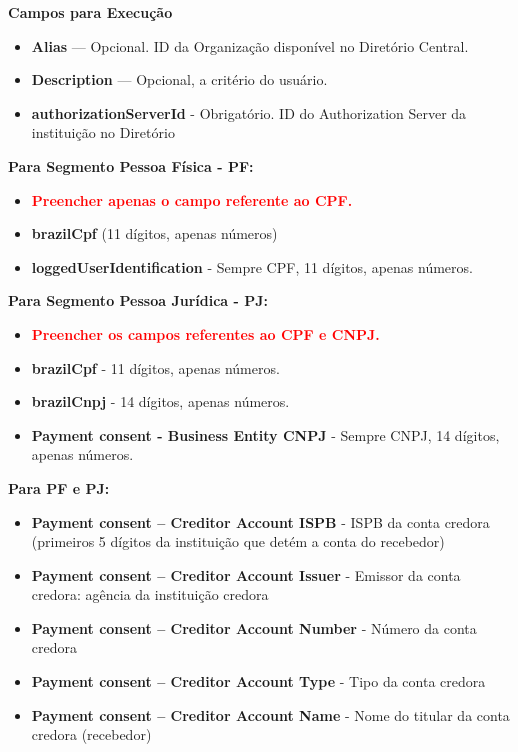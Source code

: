 \textbf{Campos para Execução}

\begin{itemize}
    \item \textbf{Alias} — Opcional. ID da Organização disponível no Diretório Central.
    \item \textbf{Description} — Opcional, a critério do usuário.
    \item \textbf{\textcolor{red!80}{authorizationServerId}} - Obrigatório. ID do Authorization Server da instituição no Diretório
\end{itemize}

\textbf{Para Segmento Pessoa Física - PF:}

\begin{itemize}
    \item \textbf{\textcolor{red}{Preencher apenas o campo referente ao CPF.}}
    \item \textbf{\textcolor{red!80}{brazilCpf}} (11 dígitos, apenas números)
    \item \textbf{\textcolor{red!80}{loggedUserIdentification}} - Sempre CPF, 11 dígitos, apenas números.
\end{itemize}

\textbf{Para Segmento Pessoa Jurídica - PJ:}
\begin{itemize}
    \item \textbf{\textcolor{red}{Preencher os campos referentes ao CPF e CNPJ.}}
    \item \textbf{\textcolor{red!80}{brazilCpf}} - 11 dígitos, apenas números.
    \item \textbf{\textcolor{red!80}{brazilCnpj}} - 14 dígitos, apenas números.
    \item \textbf{\textcolor{red!80}{Payment consent - Business Entity CNPJ}} - Sempre CNPJ, 14 dígitos, apenas números.
\end{itemize}

\textbf{Para PF e PJ:}
\begin{itemize}
    \item \textbf{\textcolor{red!80}{Payment consent – Creditor Account ISPB}} - ISPB da conta credora (primeiros 5 dígitos da instituição que detém a conta do recebedor)
    \item \textbf{\textcolor{red!80}{Payment consent – Creditor Account Issuer}} - Emissor da conta credora: agência da instituição credora
    \item \textbf{\textcolor{red!80}{Payment consent – Creditor Account Number}} - Número da conta credora
    \item \textbf{\textcolor{red!80}{Payment consent – Creditor Account Type}} - Tipo da conta credora
    \item \textbf{\textcolor{red!80}{Payment consent – Creditor Account Name}} - Nome do titular da conta credora (recebedor)
\end{itemize}

